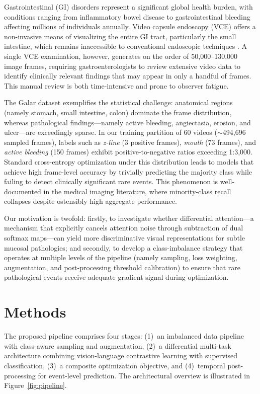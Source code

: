 \documentclass[12pt]{article}
\begin{document}
Gastrointestinal (GI) disorders represent a significant global health burden, with conditions ranging from inflammatory bowel disease to gastrointestinal bleeding affecting millions of individuals annually. Video capsule endoscopy (VCE) offers a non-invasive means of visualizing the entire GI tract, particularly the small intestine, which remains inaccessible to conventional endoscopic techniques \cite{Lawniczak2025}. A single VCE examination, however, generates on the order of 50,000--130,000 image frames, requiring gastroenterologists to review extensive video data to identify clinically relevant findings that may appear in only a handful of frames. This manual review is both time-intensive and prone to observer fatigue.

The Galar dataset \cite{LeFloch2025galar} exemplifies the statistical challenge: anatomical regions (namely stomach, small intestine, colon) dominate the frame distribution, whereas pathological findings—namely active bleeding, angiectasia, erosion, and ulcer—are exceedingly sparse. In our training partition of 60 videos ($\sim$494,696 sampled frames), labels such as \textit{z-line} (3 positive frames), \textit{mouth} (73 frames), and \textit{active bleeding} (150 frames) exhibit positive-to-negative ratios exceeding 1:3,000. Standard cross-entropy optimization under this distribution leads to models that achieve high frame-level accuracy by trivially predicting the majority class while failing to detect clinically significant rare events. This phenomenon is well-documented in the medical imaging literature, where minority-class recall collapses despite ostensibly high aggregate performance.

Our motivation is twofold: firstly, to investigate whether differential attention—a mechanism that explicitly cancels attention noise through subtraction of dual softmax maps—can yield more discriminative visual representations for subtle mucosal pathologies; and secondly, to develop a class-imbalance strategy that operates at multiple levels of the pipeline (namely sampling, loss weighting, augmentation, and post-processing threshold calibration) to ensure that rare pathological events receive adequate gradient signal during optimization.


\section{Methods}\label{sec2}

The proposed pipeline comprises four stages: (1)~an imbalanced data pipeline with class-aware sampling and augmentation, (2)~a differential multi-task architecture combining vision-language contrastive learning with supervised classification, (3)~a composite optimization objective, and (4)~temporal post-processing for event-level prediction. The architectural overview is illustrated in Figure~\ref{fig:pipeline}.
\end{document}
